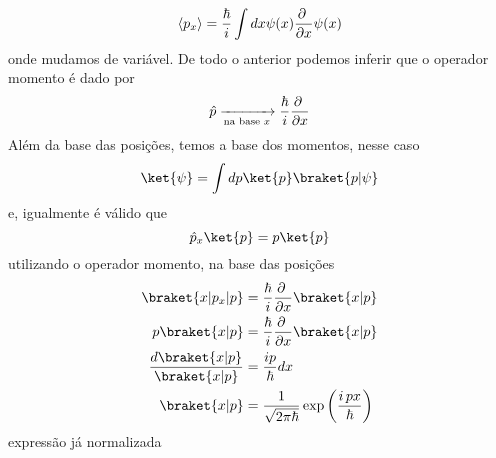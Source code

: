 \documentclass[12pt,brazil,table]{beamer}
\begin{document}
\begin{frame}
\begin{columns}[T]
  \vspace*{-1cm}
  \[
   \langle p_x \rangle = \dfrac{\hbar}{i} \int dx \psi(x)\dfrac{\partial\;}{\partial x}\psi(x)\vspace*{-0.05cm}
  \]
  onde mudamos de variável.  De todo o anterior podemos inferir que o operador momento é dado por\vspace*{-0.25cm}
  \[
   \hat{p} \xrightarrow[\text{na base }x]{} \dfrac{\hbar}{i}\dfrac{\partial\;}{\partial x}\vspace*{-0.25cm}
  \]
  Além da base das posições, temos a base dos momentos, nesse caso\vspace*{-0.25cm}
  \[
    \ket{\psi} = \int dp\ket{p}\braket{p|\psi}\vspace*{-0.25cm}
  \]
  e, igualmente é válido que\vspace*{-0.25cm}
  \[
   \hat{p}_x\ket{p} = p\ket{p}\vspace*{-0.25cm}
  \]
  utilizando o operador momento, na base das posições  \vspace*{-0.25cm}
  \[
    \begin{align*}
    \braket{x|p_x|p} &= \dfrac{\hbar}{i} \dfrac{\partial\;}{\partial x}\braket{x|p}\\
    p\braket{x|p} &=\dfrac{\hbar}{i} \dfrac{\partial\;}{\partial x}\braket{x|p}\\
    \dfrac{d\braket{x|p}}{\braket{x|p}} &= \dfrac{ip}{\hbar}dx\\
    \braket{x|p} &= \dfrac{1}{\sqrt{2\pi\hbar}}\exp\left(\dfrac{i\,p x}{\hbar}\right)
    \end{align*}\vspace*{-0.15cm}
  \]
  expressão já normalizada

  \end{columns}

\end{frame} 
  

\end{document}
